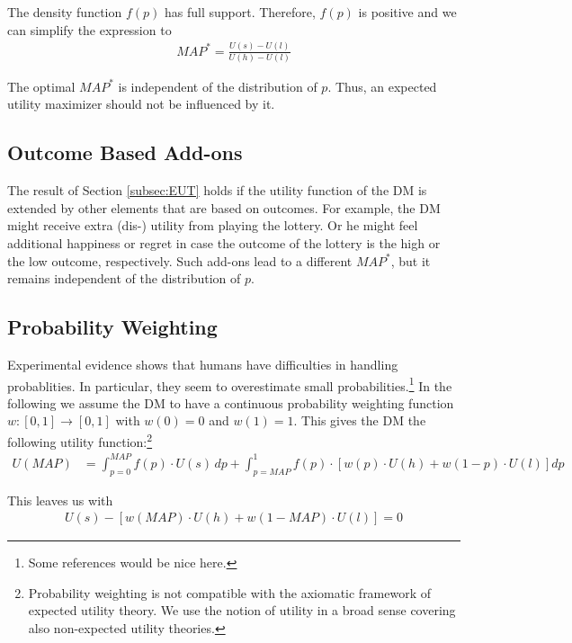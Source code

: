 The density function $f(p)$ has full support.
Therefore, $f(p)$ is positive and we can simplify the expression to 
\begin{align}
	MAP^* = \frac{U(s)-U(l)}{U(h)-U(l)}
\end{align}

The optimal $MAP^*$ is independent of the distribution of $p$.
Thus, an expected utility maximizer should not be influenced by it. 


\subsection{Outcome Based Add-ons}

The result of Section \ref{subsec:EUT} holds if the utility function of the DM is extended by other elements that are based on outcomes.
For example, the DM might receive extra \mbox{(dis-)} utility from playing the lottery.
Or he might feel additional happiness or regret in case the outcome of the lottery is the high or the low outcome, respectively.
Such add-ons lead to a different $MAP^*$, but it remains independent of the distribution of $p$.  


\subsection{Probability Weighting}

Experimental evidence shows that humans have difficulties in handling probablities.
In particular, they seem to overestimate small probabilities.\footnote{
Some references would be nice here.
} 
In the following we assume the DM to have a continuous probability weighting function $w: [0,1] \rightarrow [0,1]$ with $w(0) = 0$ and $w(1) = 1$.
This gives the DM the following utility function:\footnote{
Probability weighting is not compatible with the axiomatic framework of expected utility theory.
We use the notion of utility in a broad sense covering also non-expected utility theories.
}
\begin{align}
	U(MAP) &= \int_{p=0}^{MAP} f(p) \cdot U(s) \, dp %
	+ \int_{p=MAP}^1 f(p) \cdot \left[w(p) \cdot U(h) + w(1-p) \cdot U(l) \right] dp
\end{align}

This leaves us with 
\begin{align}
	\label{eq:FOCsimplified}
	U(s) - \left[w(MAP) \cdot U(h) + w(1-MAP) \cdot U(l) \right] = 0 
\end{align}

